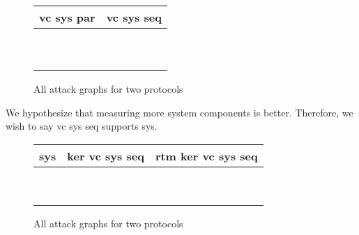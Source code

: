 \begin{figure}
    \begin{center}
        \begin{tabular}{ M{5cm} | M{5cm} }
                vc sys par & vc sys seq  \\
                \hline
                \hline
                \\  &   \\ [50pt]
                \\  &   \\ [50pt]  
                \\  &   \\ [50pt]  
                \\    &   \\ [50pt] 
                \\    &   \\ [50pt] 
            \end{tabular}
        \end{center}
        \caption{All attack graphs for two protocols}
    \end{figure}

We hypothesize that measuring more system components is better. Therefore, we wish to say vc sys seq supports sys. 

\begin{figure}
    \begin{center}
        \begin{tabular}{ M{3.75cm} | M{4.75cm} | M{3.75cm} }
                sys & ker vc sys seq & rtm ker vc sys seq  \\
                \hline
                \hline
                \\  &  &  \\ [50pt]
                \\  &  &   \\ [50pt]  
                 &   &  \\ [50pt]  
                \\  &  &   \\ [50pt] 
                \\  &  &   \\ [50pt] 
            \end{tabular}
        \end{center}
        \caption{All attack graphs for two protocols}
    \end{figure}